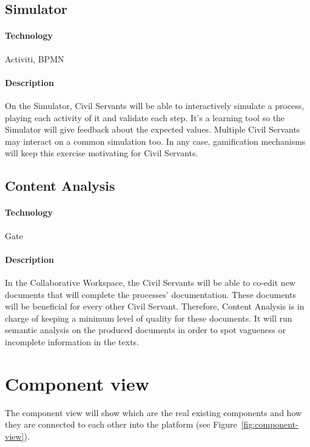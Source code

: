 \documentclass{learnpad}
\begin{document}
\subsection{Simulator}
\label{sec:simulator}

\paragraph{Technology}
Activiti, BPMN

\paragraph{Description}
On the Simulator, Civil Servants will be able to interactively simulate a
process, playing each activity of it and validate each step.  It's a learning
tool so the Simulator will give feedback about the expected values.  Multiple
Civil Servants may interact on a common simulation too.  In any case,
gamification mechanisms will keep this exercise motivating for Civil Servants.

\subsection{Content Analysis}
\label{sec:content-analysis}

\paragraph{Technology}
Gate

\paragraph{Description}
In the Collaborative Workspace, the Civil Servants will be able to co-edit new
documents that will complete the processes' documentation.  These documents will
be beneficial for every other Civil Servant.  Therefore, Content Analysis is in
charge of keeping a minimum level of quality for these documents.  It will run
semantic analysis on the produced documents in order to spot vagueness or
incomplete information in the texts.

\section{Component view}
\label{sec:component-view}
The component view will show which are the real existing components and how they
are connected to each other into the \learnpad platform (see
Figure~\ref{fig:component-view}).
\end{document}
